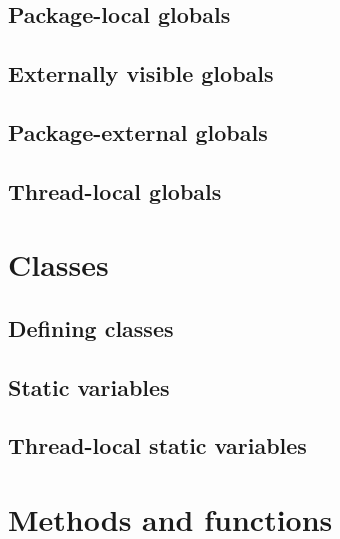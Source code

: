 \documentclass{article}
\begin{document}
\subsection{Package-local globals}
\label{sub:globals:local}

\subsection{Externally visible globals}
\label{sub:globals:visible}

\subsection{Package-external globals}
\label{sub:globals:extern}

\subsection{Thread-local globals}
\label{sub:globals:threadlocal}

\section{Classes}
\label{sec:classes}

\subsection{Defining classes}
\label{sub:classes:definition}

\subsection{Static variables}
\label{sub:classes:static}

\subsection{Thread-local static variables}
\label{sub:classes:threadlocal}

\section{Methods and functions}
\label{sec:methods}
\end{document}
